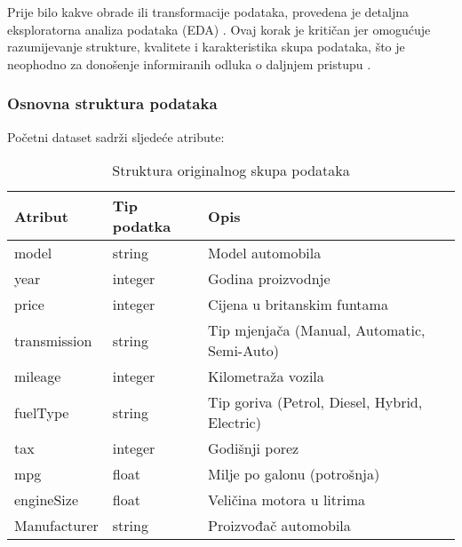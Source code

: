 Prije bilo kakve obrade ili transformacije podataka, provedena je detaljna eksploratorna analiza podataka (EDA) \cite{Komorowski2016}. Ovaj korak je kritičan jer omogućuje razumijevanje strukture, kvalitete i karakteristika skupa podataka, što je neophodno za donošenje informiranih odluka o daljnjem pristupu \cite{Ekbote2023}.

\subsubsection{Osnovna struktura podataka}

Početni dataset sadrži sljedeće atribute:

\begin{table}[H]
    \centering
    \begin{tabular}{|l|l|l|}
        \hline
        \textbf{Atribut} & \textbf{Tip podatka} & \textbf{Opis}                                 \\
        \hline
        model            & string               & Model automobila                              \\
        year             & integer              & Godina proizvodnje                            \\
        price            & integer              & Cijena u britanskim funtama                   \\
        transmission     & string               & Tip mjenjača (Manual, Automatic, Semi-Auto)   \\
        mileage          & integer              & Kilometraža vozila                            \\
        fuelType         & string               & Tip goriva (Petrol, Diesel, Hybrid, Electric) \\
        tax              & integer              & Godišnji porez                                \\
        mpg              & float                & Milje po galonu (potrošnja)                   \\
        engineSize       & float                & Veličina motora u litrima                     \\
        Manufacturer     & string               & Proizvođač automobila                         \\
        \hline
    \end{tabular}
    \caption{Struktura originalnog skupa podataka}
\end{table}

